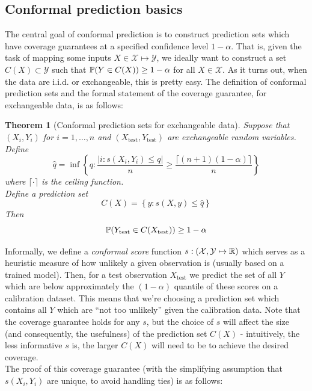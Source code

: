 \documentclass[a4paper, 12pt]{article}
\newtheorem{theorem}{Theorem}
\begin{document}
\subsection*{Conformal prediction basics}
The central goal of conformal prediction is to construct prediction sets which have coverage guarantees at
a specified confidence level $1-\alpha$. That is, given the task of mapping some inputs
$X \in \mathcal{X} \mapsto \mathcal{Y}$, we ideally want to construct a set $C(X) \subset \mathcal{Y}$ such that
$\P(Y \in C(X)) \geq 1 - \alpha$ for all $X \in \mathcal{X}$. As it turns out,
when the data are i.i.d. or exchangeable, this is pretty easy. The definition of conformal prediction sets and the formal statement of the coverage
guarantee, for exchangeable data, is as follows:
\begin{theorem}[Conformal prediction sets for exchangeable data]
    Suppose that $(X_i, Y_i)$ for $i = 1, \ldots, n$ and $(X_{\text{test}}, Y_{\text{test}})$ are exchangeable random variables. \\
    Define
    \[
        \hat{q} = \inf \left\{ q: \frac{\left| i : s(X_i, Y_i) \leq q \right|}{n} \geq \frac{\lceil (n+1)(1-\alpha) \rceil }{n} \right\}
    \]
    where $\lceil \cdot \rceil$ is the ceiling function.\\
    Define a prediction set
    \[
        C(X) = \left\{ y: s(X, y) \leq \hat{q} \right\}
    \]
    Then \[ \P (Y_{\text{test}} \in C(X_{\text{test}})) \geq 1 - \alpha \]
    \label{thm:exchangeable_conformal_prediction}
\end{theorem}
Informally, we define a \textit{conformal score} function $s : (\mathcal{X}, \mathcal{Y} \mapsto \R) $ which
serves as a heuristic measure of how unlikely a given observation is (usually based on a trained model).
Then, for a test observation $X_{\text{test}}$ we predict the set of all $Y$ which are below approximately the $(1-\alpha)$ quantile of these scores on a calibration dataset.
This means that we're choosing a prediction set which contains all $Y$ which are ``not too unlikely'' given the calibration data.
Note that the coverage guarantee holds for any $s$, but the choice of $s$ will affect the size (and consequently, the usefulness) of the prediction set $C(X)$ - intuitively,
the less informative $s$ is, the larger $C(X)$ will need to be to achieve the desired coverage. \\
The proof of this coverage guarantee (with the simplifying assumption that $s(X_i, Y_i)$ are unique, to avoid handling ties) is as follows:
\end{document}
